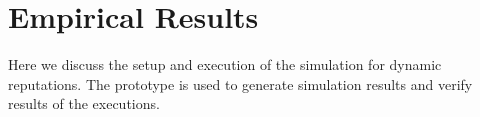 \section{Empirical Results}
\label{sec:empirical_results}

Here we discuss the setup and execution of the simulation for dynamic reputations. The prototype is used to generate simulation results and verify results of the executions.







